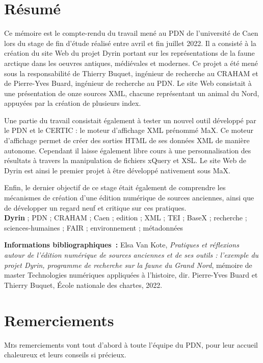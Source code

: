 \documentclass[a4paper,12pt,twoside]{book}
\begin{document}
	\chapter{Résumé}
	\medskip
	Ce mémoire est le compte-rendu du travail mené au \acrfull{PDN} de l'université de Caen lors du stage de fin d'étude réalisé entre avril et fin juillet 2022. Il a consisté à la création du site Web du projet Dyrin portant sur les représentations de la faune arctique dans les oeuvres antiques, médiévales et modernes. Ce projet a été mené sous la responsabilité de Thierry Buquet, ingénieur de recherche au \acrfull{CRAHAM} et de Pierre-Yves Buard, ingénieur de recherche au \acrlong{PDN}. Le site Web consistait à une présentation de onze sources XML, chacune représentant un animal du Nord, appuyées par la création de plusieurs index.
	
	Une partie du travail consistait également à tester un nouvel outil développé par le \acrshort{PDN} et le \acrfull{CERTIC} : le moteur d'affichage XML prénommé MaX. Ce moteur d'affichage permet de créer des sorties HTML de ses données XML de manière autonome. Cependant il laisse également libre cours à une personnalisation des résultats à travers la manipulation de fichiers xQuery et XSL. Le site Web de Dyrin est ainsi le premier projet à être développé nativement sous MaX.
	
	Enfin, le dernier objectif de ce stage était également de comprendre les mécanismes de création d'une édition numérique de sources anciennes, ainsi que de développer un regard neuf et critique sur ces pratiques. \\
	
	\textbf{Dyrin} ; {PDN} ; {CRAHAM} ; {Caen} ; {edition} ; {XML} ; {TEI} ; {BaseX} ; {recherche} ; {sciences-humaines} ; {FAIR} ; {environnement} ; {métadonnées}
	
	\textbf{Informations bibliographiques~:} Elsa Van Kote, \textit{Pratiques et réflexions autour de l'édition numérique de sources anciennes et de ses outils : l'exemple du projet Dyrin, programme de recherche sur la faune du Grand Nord}, mémoire de master \og{}Technologies numériques appliquées à l'histoire\fg{}, dir. Pierre-Yves Buard et Thierry Buquet, École nationale des chartes, 2022.
	
	\chapter{Remerciements}
	
	\lettrine{M}es remerciements vont tout d'abord à toute l'équipe du \acrshort{PDN}, pour leur accueil chaleureux et leurs conseils si précieux.\\
	
\end{document}
